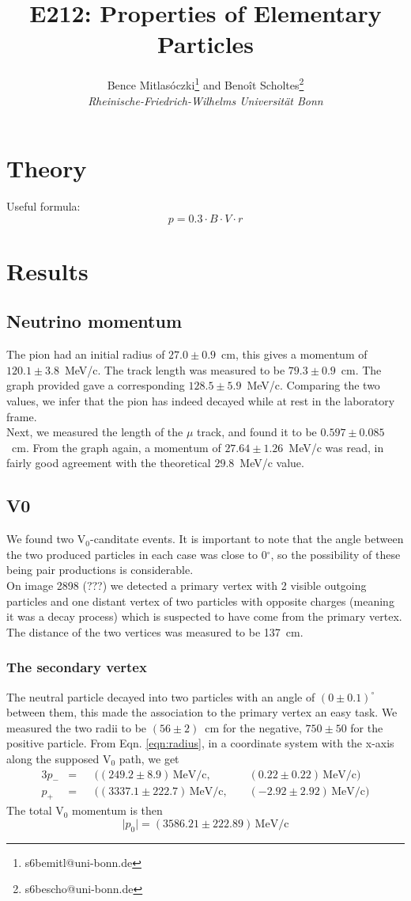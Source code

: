 \documentclass[twocolumn]{article}
\title{\textbf{E212: Properties of Elementary Particles}}
\author{Bence Mitlasóczki\thanks{s6bemitl@uni-bonn.de} and Beno\^it Scholtes\thanks{s6bescho@uni-bonn.de} \\ \textit{Rheinische-Friedrich-Wilhelms Universit\"at Bonn}}
\begin{document}
\section{Theory}
Useful formula:
\begin{equation}\label{eqn:radius}
p = 0.3 \cdot B \cdot V \cdot r
\end{equation}
\section{Results}
\subsection{Neutrino momentum}
The pion had an initial radius of $27.0 \pm 0.9$~cm, this gives a momentum of $120.1 \pm 3.8$~MeV/c. The track length was measured to be $79.3 \pm 0.9$~cm. The graph provided gave a corresponding $128.5 \pm 5.9$~MeV/c. Comparing the two values, we infer that the pion has indeed decayed while at rest in the laboratory frame.\\
Next, we measured the length of the $\mu$ track, and found it to be $0.597 \pm 0.085$~cm. From the graph again, a momentum of $27.64 \pm 1.26$~MeV/c was read, in fairly good agreement with the theoretical $29.8$~MeV/c value.
\subsection{V0}
We found two V$_0$-canditate events. It is important to note that the angle between the two produced particles in each case was close to 0$^{\circ}$, so the possibility of these being pair productions is considerable.\\
On image 2898 (???) we detected a primary vertex with 2 visible outgoing particles and one distant vertex of two particles with opposite charges (meaning it was a decay process) which is suspected to have come from the primary vertex. The distance of the two vertices was measured to be 137~cm. 
\subsubsection{The secondary vertex}
The neutral particle decayed into two particles with an angle of $(0\pm 0.1)^{\circ} $ between them, this made the association to the primary vertex an easy task. We measured the two radii to be $(56 \pm 2)$~cm for the negative, $750 \pm 50$ for the positive particle. From Eqn. \ref{eqn:radius}, in a coordinate system with the x-axis along the supposed V$_0$ path, we get 
\begin{alignat*}{3}
p_- &= &&((249.2 \pm 8.9)\, \text{MeV/c},\hspace{3pt} && (0.22 \pm 0.22)\, \text{MeV/c})\\
p_+ &= &&((3337.1 \pm 222.7)\, \text{MeV/c},\hspace{3pt} && (-2.92 \pm 2.92)\, \text{MeV/c})
\end{alignat*}
The total V$_0$ momentum is then
\begin{equation}
 \vert p_0 \vert = (3586.21 \pm 222.89)\, \text{MeV/c}
\end{equation}
\end{document}
